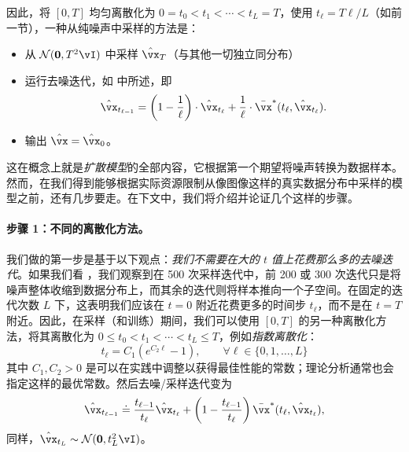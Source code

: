 \documentclass[../../book-main_zh.tex]{subfiles}
\begin{document}
因此，将 \([0, T]\) 均匀离散化为 \(0 = t_{0} < t_{1} < \cdots < t_{L} = T\)，使用 \(t_{\ell} = T\ell / L\)（如前一节），一种从纯噪声中采样的方法是：
\begin{itemize}
	\item 从 \(\dNorm(\vzero, T^{2}\vI)\) 中采样 \(\hat{\vx}_{T}\)（与其他一切独立同分布）
	\item 运行去噪迭代，如  中所述，即
		\begin{equation}\label{eq:denoising-iteration-basic}
		\hat{\vx}_{t_{\ell - 1}} = \bp{1 - \frac{1}{\ell}}\cdot\hat{\vx}_{t_{\ell}} + \frac{1}{\ell}\cdot\bar{\vx}^{\ast}(t_{\ell}, \hat{\vx}_{t_{\ell}}).
	\end{equation}
	\item 输出 \(\hat{\vx} = \hat{\vx}_{0}\)。
\end{itemize}
这在概念上就是\textit{扩散模型}的全部内容，它根据第一个期望将噪声转换为数据样本。然而，在我们得到能够根据实际资源限制从像图像这样的真实数据分布中采样的模型之前，还有几步要走。在下文中，我们将介绍并论证几个这样的步骤。

\paragraph{步骤 1：不同的离散化方法。} 我们做的第一步是基于以下观点：\textit{我们不需要在大的 \(t\) 值上花费那么多的去噪迭代}。如果我们看 ，我们观察到在 500 次采样迭代中，前 200 或 300 次迭代只是将噪声整体收缩到数据分布上，而其余的迭代则将样本推向一个子空间。在固定的迭代次数 \(L\) 下，这表明我们应该在 \(t = 0\) 附近花费更多的时间步 \(t_{\ell}\)，而不是在 \(t = T\) 附近。因此，在采样（和训练）期间，我们可以使用 \([0, T]\) 的另一种离散化方法，将其离散化为 \(0 \leq t_{0} < t_{1} < \cdots < t_{L} \leq T\)，例如\textit{指数离散化}：
\begin{equation}\label{eq:denoising_exponential_discretization}
	t_{\ell} = C_{1}(e^{C_{2}\ell} - 1), \qquad \forall \ell \in \{0, 1, \dots, L\}
\end{equation}
其中 \(C_{1}, C_{2} > 0\) 是可以在实践中调整以获得最佳性能的常数；理论分析通常也会指定这样的最优常数。然后去噪/采样迭代变为
\begin{equation}\label{eq:denoising_iteration}
	\hat{\vx}_{t_{\ell - 1}} \doteq \frac{t_{\ell - 1}}{t_{\ell}}\hat{\vx}_{t_{\ell}} + \bp{1 - \frac{t_{\ell - 1}}{t_{\ell}}}\bar{\vx}^{\ast}(t_{\ell}, \hat{\vx}_{t_{\ell}}),
\end{equation}
同样，\(\hat{\vx}_{t_{L}} \sim \dNorm(\vzero, t_{L}^{2}\vI)\)。
\end{document}
